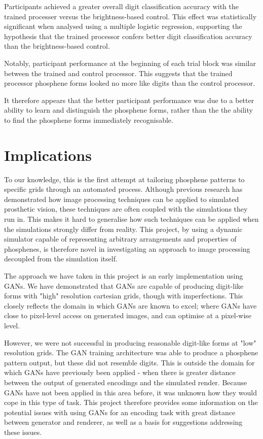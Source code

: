 \documentclass[a4paper,11pt,openany]{book}
\begin{document}
Participants achieved a greater overall digit classification accuracy with the trained processer versus the brightness-based control.
This effect was statistically significant when analysed using a multiple logistic regression, supporting the hypothesis that the trained processor confers better digit classification accuracy than the brightness-based control.

Notably, participant performance at the beginning of each trial block was similar between the trained and control processor.
This suggests that the trained processor phosphene forms looked no more like digits than the control processor.

It therefore appears that the better participant performance was due to a better ability to learn and distinguish the phosphene forms, rather than the the ability to find the phosphene forms immediately recognisable.



\chapter{Implications}
\label{sec:orgd530fbe}

To our knowledge, this is the first attempt at tailoring phosphene patterns to specific grids through an automated process.
Although previous research has demonstrated how image processing techniques can be applied to simulated prosthetic vision, these techniques are often coupled with the simulations they run in.
This makes it hard to generalise how such techniques can be applied when the simulations strongly differ from reality.
This project, by using a dynamic simulator capable of representing arbitrary arrangements and properties of phosphenes, is therefore novel in investigating an approach to image processing decoupled from the simulation itself.

The approach we have taken in this project is an early implementation using GANs.
We have demonstrated that GANs are capable of producing digit-like forms with "high" resolution cartesian grids, though with imperfections.
This closely reflects the domain in which GANs are known to excel; where GANs have close to pixel-level access on generated images, and can optimise at a pixel-wise level.

However, we were not successful in producing reasonable digit-like forms at "low" resolution grids.
The GAN training architecture was able to produce a phosphene pattern output, but these did not resemble digits.
This is outside the domain for which GANs have previously been applied - when there is greater distance between the output of generated encodings and the simulated render.
Because GANs have not been applied in this area before, it was unknown how they would cope in this type of task.
This project therefore provides some information on the potential issues with using GANs for an encoding task with great distance between generator and renderer, as well as a basis for suggestions addressing these issues.
\end{document}

